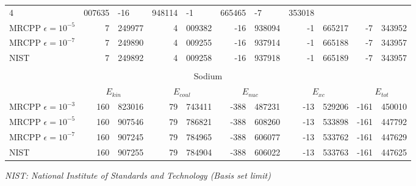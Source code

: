 \documentclass[slides]{beamer}
\begin{document}
\begin{frame}
\begin{table}
\begin{tabular}{|l|r@{.}l|r@{.}l|r@{.}l|r@{.}l|r@{.}l|}
			  4&007635&
			-16&948114&
			 -1&665465&
			 -7&353018\\
			MRCPP $\epsilon=10^{-5}$&
			  7&249977&
			  4&009382&
			-16&938094&
			 -1&665217&
			 -7&343952\\
			MRCPP $\epsilon=10^{-7}$&
			  7&249890&
			  4&009255&
			-16&937914&
			 -1&665188&
			 -7&343957\\
			\hline
			NIST&
			  7&249892&
			  4&009258&
			-16&937918&
			 -1&665189&
			 -7&343957\\
			\hline
			\multicolumn{11}{c}{}\\
			\multicolumn{11}{c}{Sodium}\\
			\hline
			&
			\multicolumn{2}{c|}{$E_{kin}$}&
			\multicolumn{2}{c|}{$E_{coul}$}&
			\multicolumn{2}{c|}{$E_{nuc}$}&
			\multicolumn{2}{c|}{$E_{xc}$}&
			\multicolumn{2}{c|}{$E_{tot}$}\\
			\hline
			MRCPP $\epsilon=10^{-3}$&
			 160&823016&
			  79&743411&
			-388&487231&
			 -13&529206&
			-161&450010\\
			MRCPP $\epsilon=10^{-5}$&
			 160&907546&
			  79&786821&
			-388&608260&
			 -13&533898&
			-161&447792\\
			MRCPP $\epsilon=10^{-7}$&
			 160&907245&
			  79&784965&
			-388&606077&
			 -13&533762&
			-161&447629\\
			\hline
			NIST&
			 160&907255&
			  79&784904&
			-388&606022&
			 -13&533763&
			-161&447625\\
			\hline
		\end{tabular}
	\end{table}
	\tiny
	\it{NIST: National Institute of Standards and Technology (Basis set limit)}\\
\end{frame}
\end{document}
